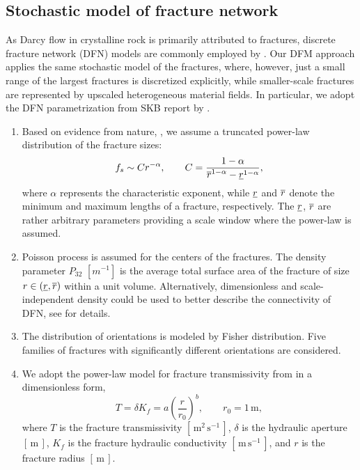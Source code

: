 \subsection{Stochastic model of fracture network}
As Darcy flow in crystalline rock is primarily attributed to fractures, discrete fracture network (DFN) models are commonly employed by \cite{deDreuzy2012Influence}. Our DFM approach 
applies the same stochastic model of the fractures, where, however, just a small range of the largest fractures is discretized explicitly, while smaller-scale fractures are represented by upscaled heterogeneous material fields. In particular, we adopt the DFN parametrization 
from SKB report by \cite{Ohman_Site_2010}.
\begin{enumerate}
\item Based on evidence from nature, \cite{Bonnet_Scaling_2001}, we assume a truncated power-law distribution of the fracture sizes:
\begin{equation}
    \label{pow_law}
    f_s \sim C r^{-\alpha},
    \qquad
    C = \frac{1-\alpha}{\overline r^{1-\alpha} - \underline r^{1-\alpha}},
\end{equation}
where $\alpha$ represents the characteristic exponent, while $\underline r$ and $\overline r$ denote the minimum and maximum lengths of a fracture, respectively. The $\underline r$, $\overline r$ are rather arbitrary parameters providing a scale window where the power-law is assumed. 

\item Poisson process is assumed for the centers of the fractures. The density parameter
$P_{32}$  $[m^{-1}]$ is the average total surface area of the fracture of size $r\in(\underline r, \overline r)$ within a unit volume. Alternatively, dimensionless and scale-independent density could be used to better describe the connectivity of DFN, see \cite{Adler1999} for details.

\item  
The distribution of orientations is modeled by Fisher distribution. Five families of fractures with significantly different orientations are considered.


\item We adopt the power-law model for fracture transmissivity from \cite{Ohman_Site_2010} in a dimensionless form,
\[
    T = \delta K_f = a\left(\frac{r}{r_0}\right)^{b},
\qquad r_0 = 1\,\mathrm{m},
\]
where $T$ is the fracture transmissivity $[\,\mathrm{m^2\,s^{-1}}\,]$, $\delta$ is the hydraulic aperture
$[\,\mathrm{m}\,]$, $K_f$ is the fracture hydraulic conductivity $[\,\mathrm{m\,s^{-1}}\,]$,
and $r$ is the fracture radius $[\,\mathrm{m}\,]$.


\end{enumerate}
